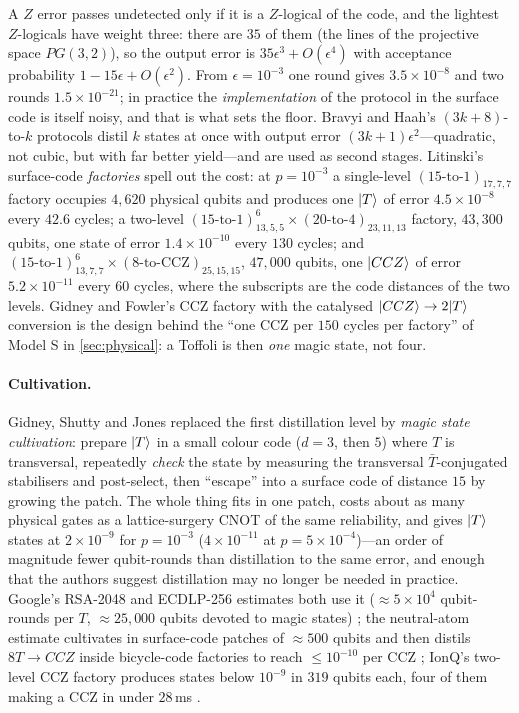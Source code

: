 A $Z$ error passes undetected only if it is a $Z$-logical of the code, and the lightest $Z$-logicals have weight three: there are $35$ of them (the lines of the projective space $PG(3,2)$), so the output error is $35\epsilon^3+O(\epsilon^4)$ with acceptance probability $1-15\epsilon+O(\epsilon^2)$. From $\epsilon=10^{-3}$ one round gives $3.5\times10^{-8}$ and two rounds $1.5\times10^{-21}$; in practice the \emph{implementation} of the protocol in the surface code is itself noisy, and that is what sets the floor. Bravyi and Haah's $(3k+8)$-to-$k$ protocols \cite{bravyi-haah12} distil $k$ states at once with output error $(3k+1)\epsilon^2$---quadratic, not cubic, but with far better yield---and are used as second stages. Litinski's surface-code \emph{factories} \cite{litinski19magic} spell out the cost: at $p=10^{-3}$ a single-level $(15\text{-to-}1)_{17,7,7}$ factory occupies $4{,}620$ physical qubits and produces one $\lvert T \rangle$ of error $4.5\times10^{-8}$ every $42.6$ cycles; a two-level $(15\text{-to-}1)^6_{13,5,5}\times(20\text{-to-}4)_{23,11,13}$ factory, $43{,}300$ qubits, one state of error $1.4\times10^{-10}$ every $130$ cycles; and $(15\text{-to-}1)^6_{13,7,7}\times(8\text{-to-CCZ})_{25,15,15}$, $47{,}000$ qubits, one $\lvert CCZ \rangle$ of error $5.2\times10^{-11}$ every $60$ cycles, where the subscripts are the code distances of the two levels. Gidney and Fowler's CCZ factory with the catalysed $\lvert CCZ \rangle\to2\lvert T \rangle$ conversion \cite{gidney-fowler19ccz} is the design behind the ``one CCZ per $150$ cycles per factory'' of Model S in \cref{sec:physical}: a Toffoli is then \emph{one} magic state, not four.

\paragraph{Cultivation.} Gidney, Shutty and Jones \cite{cultivation24} replaced the first distillation level by \emph{magic state cultivation}: prepare $\lvert T \rangle$ in a small colour code ($d=3$, then $5$) where $T$ is transversal, repeatedly \emph{check} the state by measuring the transversal $\bar T$-conjugated stabilisers and post-select, then ``escape'' into a surface code of distance $15$ by growing the patch. The whole thing fits in one patch, costs about as many physical gates as a lattice-surgery CNOT of the same reliability, and gives $\lvert T \rangle$ states at $2\times10^{-9}$ for $p=10^{-3}$ ($4\times10^{-11}$ at $p=5\times10^{-4}$)---an order of magnitude fewer qubit-rounds than distillation to the same error, and enough that the authors suggest distillation may no longer be needed in practice. Google's RSA-2048 and ECDLP-256 estimates both use it ($\approx5\times10^4$ qubit-rounds per $T$, $\approx25{,}000$ qubits devoted to magic states) \cite{gidney25rsa,babbush26}; the neutral-atom estimate cultivates in surface-code patches of $\approx500$ qubits and then distils $8T\to CCZ$ inside bicycle-code factories to reach $\le10^{-10}$ per CCZ \cite{cain26}; IonQ's two-level CCZ factory produces states below $10^{-9}$ in $319$ qubits each, four of them making a CCZ in under $28$\,ms \cite{haener26}.

